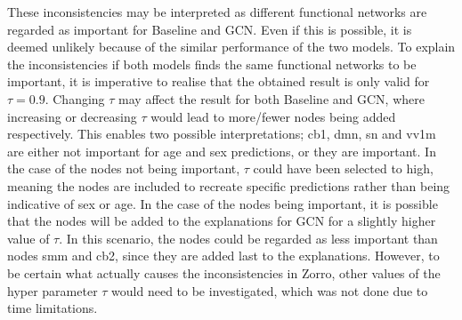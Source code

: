 
These inconsistencies may be interpreted as different functional networks are regarded as important for Baseline and GCN. Even if this is possible, it is deemed unlikely because of the similar performance of the two models. To explain the inconsistencies if both models finds the same functional networks to be important, it is imperative to realise that the obtained result is only valid for $\tau = 0.9$. Changing $\tau$ may affect the result for both Baseline and GCN, where increasing or decreasing $\tau$ would lead to more/fewer nodes being added respectively. This enables two possible interpretations; \acrshort{cb1}, \acrshort{dmn}, \acrshort{sn} and \acrshort{vv1m} are either not important for age and sex predictions, or they are important. In the case of the nodes not being important, $\tau$ could have been selected to high, meaning the nodes are included to recreate specific predictions rather than being indicative of sex or age. 
In the case of the nodes being important, it is possible that the nodes will be added to the explanations for GCN for a slightly higher value of $\tau$. In this scenario, the nodes could be regarded as less important than nodes \acrshort{smm} and \acrshort{cb2}, since they are added last to the explanations. However, to be certain what actually causes the inconsistencies in Zorro, other values of the hyper parameter $\tau$ would need to be investigated, which was not done due to time limitations. 


